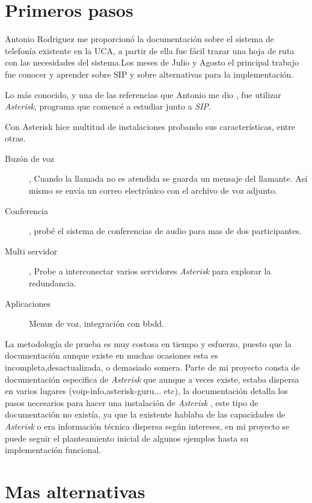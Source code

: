 \documentclass{article}
\begin{document}
\section{Primeros pasos}
\label{sec:primeros-pasos}


Antonio Rodriguez me proporcionó la documentación sobre el sistema de telefonía existente en la UCA, a partir de ella fue fácil trazar una hoja de ruta con las necesidades del sistema.Los meses de Julio y Agosto el principal trabajo fue conocer y aprender sobre SIP y sobre alternativas para la implementación.

Lo más conocido, y una de las referencias que Antonio me dio , fue utilizar \emph{Asterisk}, programa que comencé a estudiar junto a \emph{SIP}. 

Con Asterisk hice multitud de instalaciones probando sus características, entre otras.
\begin{description}
  \item[Buzón de voz], Cuando la llamada no es atendida se guarda un mensaje del llamante. Así mismo se envía un correo electrónico con el archivo de voz adjunto.

  \item[Conferencia], probé el sistema de conferencias de audio para mas de dos participantes.

  \item[Multi servidor], Probe a interconectar varios servidores \emph{Asterisk} para explorar la redundancia. 

  \item[Aplicaciones] Menus de voz, integración con bbdd.
\end{description}


La metodología de prueba es muy costosa en tiempo y esfuerzo, puesto que la documentación aunque existe en muchas ocasiones esta es incompleta,desactualizada, o demasiado somera. Parte de mi proyecto consta de documentación especifica de \emph{Asterisk} que aunque a veces existe, estaba dispersa en varios lugares (voip-info,asterisk-guru... etc), la documentación detalla los pasos necesarios para hacer una instalación de \emph{Asterisk} , este tipo de documentación no existía, ya que la existente hablaba de las capacidades de \emph{Asterisk} o era información técnica dispersa según intereses, en mi proyecto se puede seguir el planteamiento inicial de algunos ejemplos hasta su implementación funcional.




\section{Mas alternativas}
\label{sec:mas-alternativas}
\end{document}

